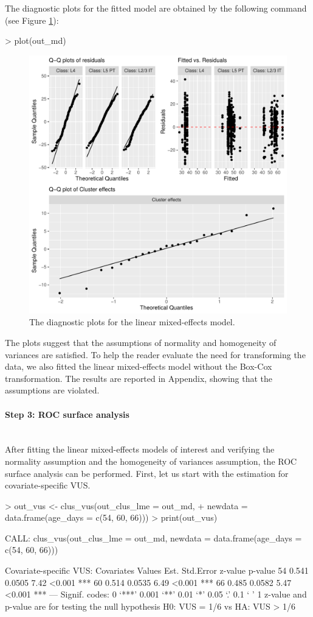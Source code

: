 \noindent
The diagnostic plots for the fitted model are obtained by the following command (see Figure \ref{fig:diag-md}):

\begin{example}
> plot(out_md)
\end{example}

\begin{figure}[htbp]
\centering 
\includegraphics[width=0.7\linewidth]{diagnosis_model.pdf}
\caption{The diagnostic plots for the linear {mixed-effects} model.}
\label{fig:diag-md}
\end{figure}

{\color{blue}
\noindent
The plots suggest that the assumptions of normality and homogeneity of variances are satisfied. To help the reader evaluate the need for transforming the data, we also fitted the linear mixed-effects model without the Box-Cox transformation. The results are reported in Appendix, showing that the assumptions are violated.
}

\paragraph{Step 3: ROC surface analysis} \text{}\\
After fitting the linear {mixed-effects} models of interest and verifying the {normality assumption} and {the homogeneity of variances assumption}, the ROC surface analysis can be performed. First, let us start with the estimation for covariate-specific VUS.

\begin{example}
> out_vus <- clus_vus(out_clus_lme = out_md, 
+                     newdata = data.frame(age_days = c(54, 60, 66)))
> print(out_vus)

CALL: clus_vus(out_clus_lme = out_md, newdata = data.frame(age_days = c(54, 
    60, 66)))
 
Covariate-specific VUS: 
 Covariates Values  Est. Std.Error z-value p-value    
                54 0.541    0.0505    7.42  <0.001 ***
                60 0.514    0.0535    6.49  <0.001 ***
                66 0.485    0.0582    5.47  <0.001 ***
---
Signif. codes:    0 ‘***’ 0.001 ‘**’ 0.01 ‘*’ 0.05 ‘.’ 0.1 ‘ ’ 1
z-value and p-value are for testing the null hypothesis H0: VUS = 1/6 vs HA: VUS > 1/6 
\end{example}

